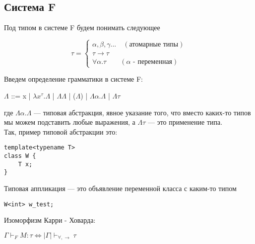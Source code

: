  	\subsection{Система F}
 	
\begin{definition}
	 	Под типом в системе F будем понимать следующее

 	
 	\begin{equation*}
 	\tau =
 	\begin{cases}
 	\alpha,\beta,\gamma ...\quad(\text{атомарные типы}) \\
 	\tau\rightarrow\tau \\
 	\forall\alpha.\tau\qquad(\alpha\text{ - переменная})
 	\end{cases}
 	\end{equation*}
 \end{definition}

 \begin{definition}
 		Введем определение грамматики в системе F:
 	\begin{center}
 		$\Lambda$ ::= x | $\lambda x^{\tau}.\Lambda$ | $\Lambda\Lambda$ | ($\Lambda$) | $\Lambda\alpha.\Lambda$ | $\Lambda\tau$ 
 	\end{center}
 \end{definition}
 	
	где $\Lambda\alpha.\Lambda$ --- типовая абстракция, явное указание того, что вместо каких-то типов мы можем подставить любые выражения, а $\Lambda\tau$ --- это применение типа. \\
 	
 	
 	Так, пример типовой абстракции это: 
    \begin{verbatim}
template<typename T>
class W {
    T x;
}
    \end{verbatim}
 	
	Типовая аппликация --- это объявление переменной класса с каким-то типом
 	
    \begin{verbatim}
W<int> w_test;
    \end{verbatim}
 	
 	\begin{theorem}
 		Изоморфизм Карри - Ховарда:
    \begin{center}
 		$\Gamma\vdash_F M:\tau\Leftrightarrow |\Gamma|\vdash_{\forall, \rightarrow}\tau$ 
    \end{center}
 	
 	\end{theorem}
 	
